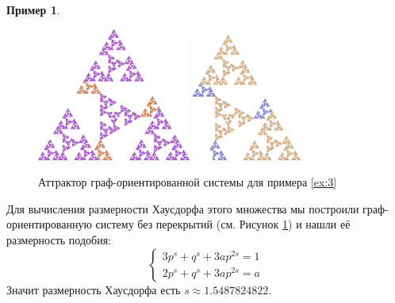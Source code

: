 \documentclass[a4paper,14pt]{extarticle} %
\newcommand{\0}{\varnothing}
\newcommand{\8}{\infty}
\theoremstyle{definition}
\newtheorem{example}{Пример}
\begin{document}
\begin{example}
\begin{figure}[H]
    \centering
    \includegraphics[width=0.45\textwidth]{den_tr_1.png}
    \hfill
    \includegraphics[width=0.32\textwidth]{den_tr_2.png}
    \caption{Аттрактор граф-ориентированной системы для примера \ref{ex:3}}
    \label{fig:pr3}
\end{figure}

Для вычисления размерности Хаусдорфа этого множества мы построили граф-ориентированную систему без перекрытий (см. Рисунок \ref{fig:pr3}) и нашли её размерность подобия:
$$
\begin{cases}
3p^s + q^s + 3ap^{2s} = 1\\
2p^s + q^s + 3ap^{2s} = a
\end{cases}
$$
Значит размерность Хаусдорфа есть $s\approx1.5487824822$.
\end{example}
\end{document}
